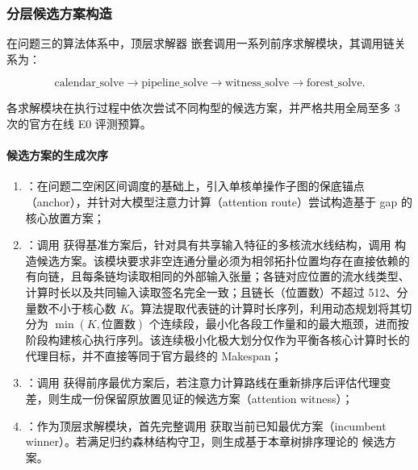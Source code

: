 \documentclass[anonymous,withtoc]{gmcm2026}
\providecommand{\tightlist}{\setlength{\itemsep}{0pt}\setlength{\parskip}{0pt}}
\begin{document}
\subsubsection{分层候选方案构造}

在问题三的算法体系中，顶层求解器 \texttt{} 嵌套调用一系列前序求解模块，其调用链关系为：

\begin{equation}
\text{calendar\_solve} \longrightarrow \text{pipeline\_solve} \longrightarrow \text{witness\_solve} \longrightarrow \text{forest\_solve}.
\end{equation}

各求解模块在执行过程中依次尝试不同构型的候选方案，并严格共用全局至多 3 次的官方在线 E0 评测预算。

\paragraph{候选方案的生成次序}

\begin{enumerate}
\def\labelenumi{\arabic{enumi}.}
\tightlist
\item
  \textbf{\texttt{}}：在问题二空闲区间调度的基础上，引入单核单操作子图的保底锚点（anchor），并针对大模型注意力计算（attention route）尝试构造基于 gap 的核心放置方案；
\item
  \textbf{\texttt{}}：调用 \texttt{} 获得基准方案后，针对具有共享输入特征的多核流水线结构，调用 \texttt{} 构造候选方案。该模块要求非空连通分量必须为相邻拓扑位置均存在直接依赖的有向链，且每条链均读取相同的外部输入张量；各链对应位置的流水线类型、计算时长以及共同输入读取签名完全一致；且链长（位置数）不超过 512、分量数不小于核心数 \(K\)。算法提取代表链的计算时长序列，利用动态规划将其切分为 \(\min(K, \text{位置数})\) 个连续段，最小化各段工作量和的最大瓶颈，进而按阶段构建核心执行序列。该连续极小化极大划分仅作为平衡各核心计算时长的代理目标，并不直接等同于官方最终的 Makespan；
\item
  \textbf{\texttt{}}：调用 \texttt{} 获得前序最优方案后，若注意力计算路线在重新排序后评估代理变差，则生成一份保留原放置见证的候选方案（attention witness）；
\item
  \textbf{\texttt{}}：作为顶层求解模块，首先完整调用 \texttt{} 获取当前已知最优方案（incumbent winner）。若满足归约森林结构守卫，则生成基于本章树排序理论的 \texttt{} 候选方案。
\end{enumerate}
\end{document}
